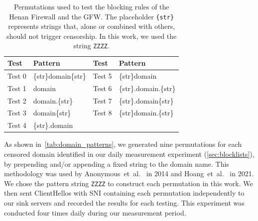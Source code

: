 \documentclass[conference,compsoc]{IEEEtran}
\begin{document}
\begin{table}[t]
  \centering
  \small
  \caption{Permutations used to test the blocking rules of the Henan Firewall and the GFW.
  The placeholder \texttt{\{str\}} represents strings that,
  alone or combined with others,
  should not trigger censorship.
  In this work,
  we used the string \texttt{ZZZZ}.
  }
  \begin{tabular}{ll ll}
    \toprule
    \textbf{Test} & \textbf{Pattern} & \textbf{Test} & \textbf{Pattern} \\
    \midrule
    Test 0 & \{str\}domain\{str\} & Test 5  & \{str\}domain \\
    Test 1 & domain & Test 6 & \{str\}.domain.\{str\} \\
    Test 2 & domain.\{str\} & Test 7 & \{str\}.domain\{str\} \\
    Test 3 & domain\{str\} & Test 8 & \{str\}domain.\{str\} \\
    Test 4 & \{str\}.domain & & \\
    \bottomrule
  \end{tabular}
  \label{tab:domain_patterns}
\end{table}

As shown in~\autoref{tab:domain_patterns},
we generated nine permutations for each censored domain
identified in our daily measurement experiment (\autoref{sec:blocklists}),
by prepending and/or appending a fixed string to the domain name.
This methodology was used by
Anonymous~et~al.~\cite[\S 6]{Anonymous2014a} in 2014
and Hoang~et~al.~\cite[\S 4.1]{Hoang2021a} in 2021.
We chose the pattern string \texttt{ZZZZ} to construct each permutation in this work.
We then sent ClientHellos with SNI containing each permutation independently to our sink servers
and recorded the results for each testing.
This experiment was conducted four times daily during our measurement period.


\end{document}
